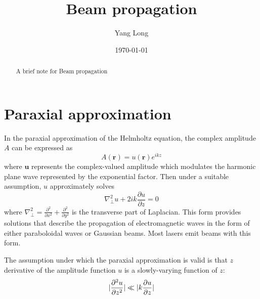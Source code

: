 \documentclass[%
 reprint,
 amsmath,amssymb,
 aps,
 rmp,
]{revtex4-1}
\begin{document}

\title{Beam propagation}%

\author{Yang Long}%
%


\date{\today}%

\begin{abstract}
A brief note for Beam propagation
\end{abstract}

\maketitle

\section{Paraxial approximation}
In the paraxial approximation of the Helmholtz equation, the complex amplitude $A$ can be expressed as
\begin{equation}
A(\bm{r}) = u(\bm{r})e^{ikz}
\end{equation}
where $\bm{u}$ represents the complex-valued amplitude which modulates the harmonic plane wave represented by the exponential factor. Then under a suitable assumption, $u$ approximately solves
\begin{equation}
\nabla^2_{\perp} u + 2ik\frac{\partial u}{\partial z} = 0
\end{equation}
where $\nabla^2_{\perp} = \frac{\partial^2}{\partial x^2} + \frac{\partial^2}{\partial y^2}$ is the transverse part of Laplacian. This form provides solutions that describe the propagation of electromagnetic waves in the form of either paraboloidal waves or Gaussian beams. Most lasers emit beams with this form.

The assumption under which the paraxial approximation is valid is that $z$ derivative of the amplitude function $u$ is a slowly-varying function of $z$:
\begin{equation}
\arrowvert \frac{\partial^2 u}{\partial z^2}\arrowvert \ll \arrowvert k \frac{\partial u}{\partial z}\arrowvert
\end{equation}
\end{document}
